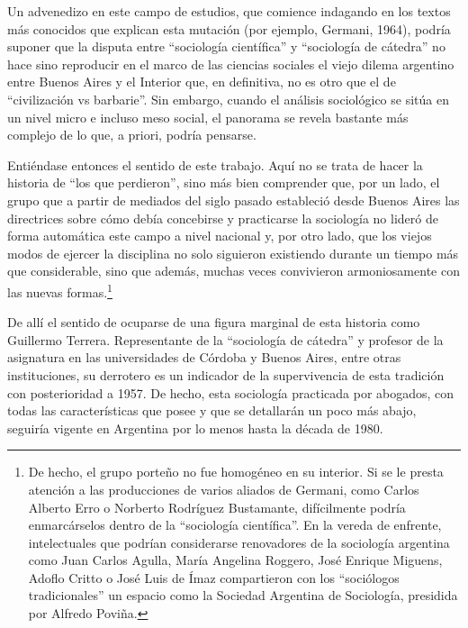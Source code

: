 Un advenedizo en este campo de estudios, que comience indagando en los textos más conocidos que explican esta mutación (por ejemplo, Germani, 1964), podría suponer que la disputa entre \enquote{sociología científica} y \enquote{sociología de cátedra} no hace sino reproducir en el marco de las ciencias sociales el viejo dilema argentino entre Buenos Aires y el Interior que, en definitiva, no es otro que el de \enquote{civilización vs barbarie}. Sin embargo, cuando el análisis sociológico se sitúa en un nivel micro e incluso meso social, el panorama se revela bastante más complejo de lo que, a priori, podría pensarse.

Entiéndase entonces el sentido de este trabajo. Aquí no se trata de hacer la historia de \enquote{los que perdieron}, sino más bien comprender que, por un lado, el grupo que a partir de mediados del siglo pasado estableció desde Buenos Aires las directrices sobre cómo debía concebirse y practicarse la sociología no lideró de forma automática este campo a nivel nacional y, por otro lado, que los viejos modos de ejercer la disciplina no solo siguieron existiendo durante un tiempo más que considerable, sino que además, muchas veces convivieron armoniosamente con las nuevas formas.\footnote{De hecho, el grupo porteño no fue homogéneo en su interior. Si se le presta atención a las producciones de varios aliados de Germani, como Carlos Alberto Erro o Norberto Rodríguez Bustamante, difícilmente podría enmarcárselos dentro de la \enquote{sociología científica}. En la vereda de enfrente, intelectuales que podrían considerarse renovadores de la sociología argentina como Juan Carlos Agulla, María Angelina Roggero, José Enrique Miguens, Adoflo Critto o José Luis de Ímaz compartieron con los \enquote{sociólogos tradicionales} un espacio como la Sociedad Argentina de Sociología, presidida por Alfredo Poviña.}

De allí el sentido de ocuparse de una figura marginal de esta historia como Guillermo Terrera. Representante de la \enquote{sociología de cátedra} y profesor de la asignatura en las universidades de Córdoba y Buenos Aires, entre otras instituciones, su derrotero es un indicador de la supervivencia de esta tradición con posterioridad a 1957. De hecho, esta sociología practicada por abogados, con todas las características que posee y que se detallarán un poco más abajo, seguiría vigente en Argentina por lo menos hasta la década de 1980.

